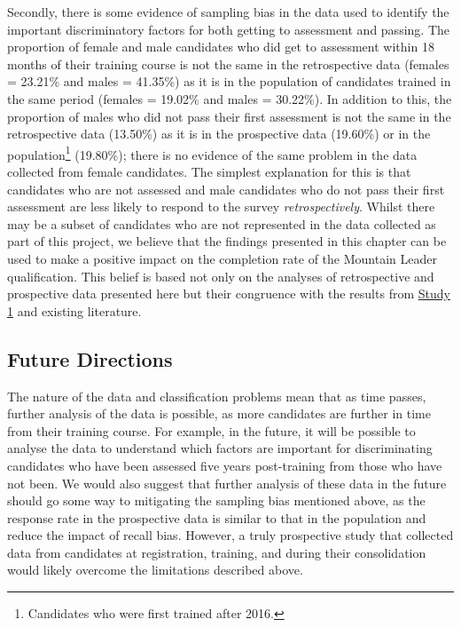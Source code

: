 \documentclass[
  12pt,
  a4paper,
]{book}
\begin{document}
Secondly, there is some evidence of sampling bias in the data used to identify the important discriminatory factors for both getting to assessment and passing. The proportion of female and male candidates who did get to assessment within 18 months of their training course is not the same in the retrospective data (females = 23.21\% and males = 41.35\%) as it is in the population of candidates trained in the same period (females = 19.02\% and males = 30.22\%). In addition to this, the proportion of males who did not pass their first assessment is not the same in the retrospective data (13.50\%) as it is in the prospective data (19.60\%) or in the population\footnote{Candidates who were first trained after 2016.} (19.80\%); there is no evidence of the same problem in the data collected from female candidates. The simplest explanation for this is that candidates who are not assessed and male candidates who do not pass their first assessment are less likely to respond to the survey \emph{retrospectively}. Whilst there may be a subset of candidates who are not represented in the data collected as part of this project, we believe that the findings presented in this chapter can be used to make a positive impact on the completion rate of the Mountain Leader qualification. This belief is based not only on the analyses of retrospective and prospective data presented here but their congruence with the results from \protect\hyperlink{ml-qualitative}{Study 1} and existing literature.

\hypertarget{ml-pra-future-directions}{%
\subsection{Future Directions}\label{ml-pra-future-directions}}

The nature of the data and classification problems mean that as time passes, further analysis of the data is possible, as more candidates are further in time from their training course. For example, in the future, it will be possible to analyse the data to understand which factors are important for discriminating candidates who have been assessed five years post-training from those who have not been. We would also suggest that further analysis of these data in the future should go some way to mitigating the sampling bias mentioned above, as the response rate in the prospective data is similar to that in the population and reduce the impact of recall bias. However, a truly prospective study that collected data from candidates at registration, training, and during their consolidation would likely overcome the limitations described above.
\end{document}

